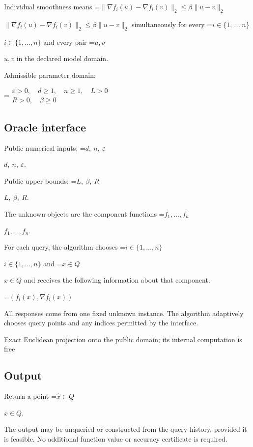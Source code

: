 \documentclass[10pt,a4paper]{article}
\newcommand{\AtlasMath}[1]{\par\begingroup\centering\setbox0=\hbox{$\displaystyle #1$}\ifdim\wd0>1.4\linewidth\typeout{ATLAS WIDE FORMULA: \the\wd0}\fi\ifdim\wd0>\linewidth\resizebox{\linewidth}{!}{\box0}\else\box0\fi\par\endgroup}
\newcommand{\AtlasInlineMath}[1]{\begingroup\setbox0=\hbox{$#1$}\ifdim\wd0>.4\linewidth\endgroup\AtlasMath{#1}\else\endgroup$#1$\fi}
\begin{document}
Individual smoothness means \AtlasInlineMath{\|\nabla f_i(u)-\nabla f_i(v)\|_2\le\beta\|u-v\|_2} simultaneously for every \AtlasInlineMath{i\in\{1,\ldots,n\}} and every pair \AtlasInlineMath{u,v} in the declared model domain.



Admissible parameter domain:


\AtlasMath{\begin{gathered}\varepsilon > 0,\quad d \ge 1,\quad n \ge 1,\quad L > 0\\R > 0,\quad \beta \ge 0\end{gathered}}




\subsection{Oracle interface}


Public numerical inputs: \AtlasInlineMath{d,\ n,\ \varepsilon}.



Public upper bounds: \AtlasInlineMath{L,\ \beta,\ R}.



The unknown objects are the component functions \AtlasInlineMath{f_1,\ldots,f_n}.



For each query, the algorithm chooses \AtlasInlineMath{i\in\{1,\ldots,n\}} and \AtlasInlineMath{x\in Q} and receives the following information about that component.




\AtlasMath{(f_i(x),\nabla f_i(x))}




All responses come from one fixed unknown instance. The algorithm adaptively chooses query points and any indices permitted by the interface.



Exact Euclidean projection onto the public domain; its internal computation is free



\subsection{Output}


Return a point \AtlasInlineMath{\widehat x\in Q}.



The output may be unqueried or constructed from the query history, provided it is feasible. No additional function value or accuracy certificate is required.
\end{document}
